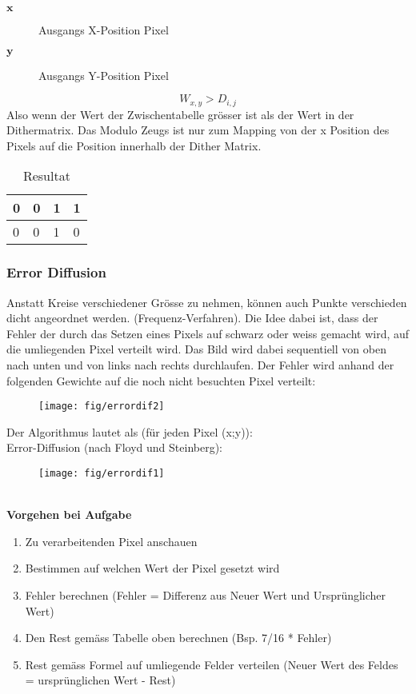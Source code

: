 \begin{description}
	\item[\(\mathbf{x}\)] Ausgangs X-Position Pixel 
	\item[\(\mathbf{y}\)] Ausgangs Y-Position Pixel
\end{description}

\begin{displaymath}
W_{x,y} > D_{i,j}
\end{displaymath}
Also wenn der Wert der Zwischentabelle grösser ist als der Wert in der Dithermatrix. Das Modulo Zeugs ist nur zum Mapping von der x Position des Pixels auf die Position innerhalb der Dither Matrix.

\begin{table}[!ht]
	\centering
	\caption{Resultat}
	\label{tbl:resultat_dither}
	\begin{tabular}{|l|l|l|l|}
		\hline
		0 & 0 & 1 & 1 \\ \hline
		0  & 0  & 1 & 0 \\ 
		\hline
	\end{tabular}
\end{table}


\subsubsection{Error Diffusion}
Anstatt Kreise verschiedener Grösse zu nehmen, können auch Punkte verschieden dicht angeordnet werden. (Frequenz-Verfahren). Die Idee dabei ist, dass der Fehler der durch das Setzen eines Pixels auf schwarz oder weiss gemacht wird, auf die umliegenden Pixel verteilt wird. Das Bild wird dabei sequentiell von oben nach unten und von links nach rechts durchlaufen. Der Fehler wird anhand der folgenden Gewichte auf die noch nicht besuchten Pixel verteilt:\\
\begin{figure}[!ht]
\centering
\texttt{[image: fig/errordif2]}
\end{figure}
\noindent
Der Algorithmus lautet als (für jeden Pixel (x;y)):\\
Error-Diffusion (nach Floyd und Steinberg):\\
\begin{figure}[!ht]
\texttt{[image: fig/errordif1]}
\end{figure}\\
\noindent
\textbf{Vorgehen bei Aufgabe} \\
\begin{enumerate}
  \item Zu verarbeitenden Pixel anschauen
  \item Bestimmen auf welchen Wert der Pixel gesetzt wird
  \item Fehler berechnen (Fehler = Differenz aus Neuer Wert und Ursprünglicher Wert)
  \item Den Rest gemäss Tabelle oben berechnen (Bsp. 7/16 * Fehler)
  \item Rest gemäss Formel auf umliegende Felder verteilen (Neuer Wert des Feldes = ursprünglichen Wert - Rest)
\end{enumerate}

